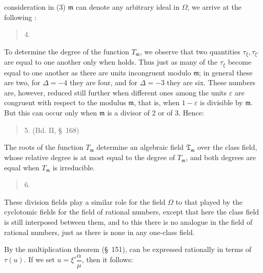 consideration in (3) $\mathfrak{m}$ can denote any arbitrary ideal in $\Omega$, we arrive at the following :

\begin{quote}
4. 
\end{quote}

To determine the degree of the function $T_{\mathfrak m}$, we observe that two quantities $\tau_\xi, \tau_{\xi'}$ are equal to one another only when
holds. Thus just as many of the $\tau_\xi$ become equal to one another as there are units incongruent modulo $\mathfrak{m}$; in general these are two, for $\Delta = -4$ they are four, and for $\Delta = -3$ they are six. These numbers are, however, reduced still further when different ones among the units $\varepsilon$ are congruent with respect to the modulus $\mathfrak{m}$, that is, when $1 - \varepsilon$ is divisible by $\mathfrak{m}$. But this can occur only when $\mathfrak{m}$ is a divisor of 2 or of 3. Hence:

\begin{quote}
5.  (Bd. II, \S\ 168) 
\end{quote}

The roots of the function $T_{\mathfrak m}$ determine an algebraic field $\mathfrak{T}_{\mathfrak m}$ over the class field, whose relative degree is at most equal to the degree of $T_{\mathfrak m}$, and both degrees are equal when $T_{\mathfrak m}$ is irreducible.

\begin{quote}
6. 
\end{quote}

These division fields play a similar role for the field $\Omega$ to that played by the cyclotomic fields for the field of rational numbers, except that here the class field is still interposed between them, and to this there is no analogue in the field of rational numbers, just as there is none in any one-class field.

By the multiplication theorem (\S\ 151),
can be expressed rationally in terms of $\tau(u)$. If we set $u = \xi'\dfrac{\alpha}{\mu}$, then it follows:
